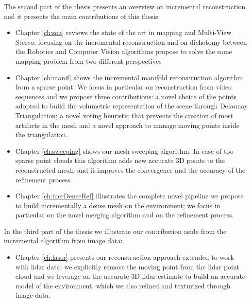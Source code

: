 The second part of the thesis presents an overview on incremental reconstruction and it presents the main contributions of this thesis.
\begin{itemize}
 \item Chapter \ref{ch:soa} reviews the state of the art in mapping and Multi-View Stereo, focusing on the incremental reconstruction and on dichotomy between the Robotics and  Computer Vision algorithms propose to solve the same mapping problem from two different perspectives
 \item Chapter \ref{ch:manif} shows the incremental manifold reconstruction algorithm from a sparse point. We focus in particular on reconstruction from video sequences and we propose three contributions: a novel choice of the points adopted to build the volumetric representation of the scene through Delaunay Triangulation; a novel voting heuristic that prevents the creation of most artifacts in the mesh and a novel approach to manage moving points inside the triangulation.
 \item Chapter \ref{ch:sweeping} shows our mesh sweeping algorithm. In case of too sparse point clouds this algorithm adds new accurate 3D points to the reconstructed mesh, and it  improves the convergence and the accuracy of the refinement process.
 \item Chapter \ref{ch:incrDenseRef} illustrates the complete novel pipeline we propose to build incrementally a dense mesh on the environment; we focus in particular on the novel merging algorithm and on the refinement process.
\end{itemize}

In the third part of the thesis we illustrate our contribution aside from the incremental algorithm from image data:
\begin{itemize}
 \item Chapter \ref{ch:laser} presents our reconstruction approach extended to work with lidar data: we explicitly remove the moving point from the lidar point cloud and we leverage on the accurate 3D lidar estimate to build an accurate model of the environment, which we also refined and texturized through image data.
\end{itemize}















